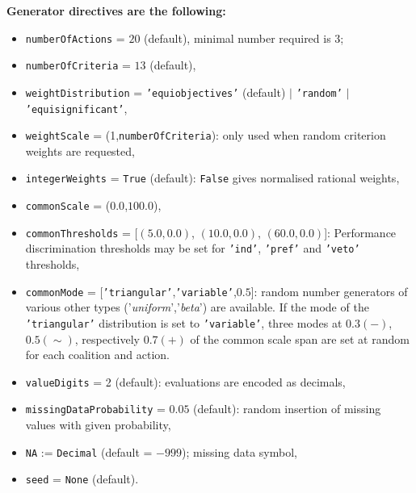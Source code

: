 \noindent \textbf{Generator directives are the following:}

\begin{itemize}[leftmargin=0.5cm,rightmargin=0.5cm]
\item \texttt{numberOfActions} = $20$ (default), minimal number required is 3; 
\item \texttt{numberOfCriteria} = $13$ (default),
\item \texttt{weightDistribution} = \texttt{'equiobjectives'} (default) $|$ \texttt{'random'} $|$ \texttt{'equisignificant'},
\item \texttt{weightScale} = (1,\texttt{numberOfCriteria}): only used when random criterion weights are requested,
\item \texttt{integerWeights} = \texttt{True} (default): \texttt{False} gives normalised rational weights, 
\item \texttt{commonScale} = ($0.0$,$100.0$),
\item \texttt{commonThresholds} = [$(5.0,0.0)$, $(10.0,0.0)$, $(60.0,0.0)$]: Performance discrimination thresholds may be set for \texttt{'ind'}, \texttt{'pref'} and \texttt{'veto'} thresholds,  
\item \texttt{commonMode} = [\texttt{'triangular'},\texttt{'variable'},$0.5$]: random number generators of various other types ('\emph{uniform}','\emph{beta}') are available. If the mode of the \texttt{'triangular'} distribution is set to \texttt{'variable'}, three modes at $0.3 (-)$, $0.5 (\sim)$, respectively $0.7 (+)$ of the common scale span are set at random for each coalition and action. 
\item \texttt{valueDigits} = 2 (default): evaluations are encoded as decimals,
\item \texttt{missingDataProbability} = $0.05$ (default): random insertion of missing values with given probability,  
\item \texttt{NA} := \texttt{Decimal} (default = $-999$); missing data symbol,
\item \texttt{seed} = \texttt{None} (default). 
\end{itemize}

